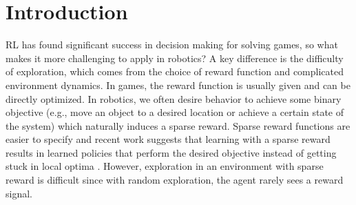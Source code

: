 % 






\section{Introduction}

RL has found significant success in decision making for solving games, so what makes it more challenging to apply in robotics? A key difference is the difficulty of exploration, which comes from  the choice of reward function and complicated environment dynamics. In games, the reward function is usually given and can be directly optimized. In robotics, we often desire behavior to achieve some binary objective (e.g., move an object to a desired location or achieve a certain state of the system) which naturally induces a sparse reward. Sparse reward functions are easier to specify and recent work suggests that learning with a sparse reward results in learned policies that perform the desired objective instead of getting stuck in local optima \cite{andrychowicz2017her, vecerik17ddpgfd}. However, exploration in an environment with sparse reward is difficult since with random exploration, the agent rarely sees a reward signal.

